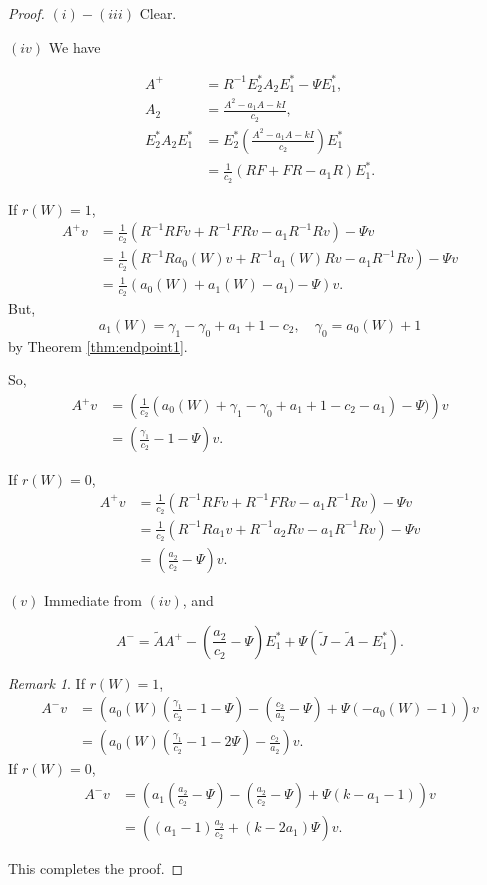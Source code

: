 \documentclass[
]{book}
\theoremstyle{definition}
\theoremstyle{definition}
\theoremstyle{definition}
\theoremstyle{definition}
\theoremstyle{remark}
\newtheorem*{remark}{Remark}
\begin{document}
\begin{proof}
\leavevmode

\((i)-(iii)\) Clear.

\((iv)\) We have

\begin{align}
A^+ & = R^{-1}E^*_2A_2E^*_1 - \Psi E^*_1,\\
A_2 & = \frac{A^2-a_1A - kI}{c_2},\\
E^*_2A_2E^*_1 & = E^*_2\left(\frac{A^2-a_1A - kI}{c_2}\right)E^*_1\\
& = \frac{1}{c_2}(RF + FR - a_1R)E^*_1.
\end{align}

If \(r(W) = 1\),
\begin{align}
A^+v & = \frac{1}{c_2}(R^{-1}RFv + R^{-1}FRv - a_1R^{-1}Rv) - \Psi v\\
& = \frac{1}{c_2}(R^{-1}Ra_0(W)v + R^{-1}a_1(W)Rv - a_1R^{-1}Rv) - \Psi v\\
& = \frac{1}{c_2}\left(a_0(W) + a_1(W) - a_1) - \Psi\right)v.
\end{align}
But,
\[a_1(W) = \gamma_1 - \gamma_0 + a_1 + 1 - c_2, \quad \gamma_0 = a_0(W) + 1\]
by Theorem \ref{thm:endpoint1}.

So,
\begin{align}
A^+v & = \left(\frac{1}{c_2}(a_0(W) + \gamma_1 - \gamma_0 + a_1 + 1 - c_2 - a_1) - \Psi)\right)v\\
& = \left(\frac{\gamma_1}{c_2}-1-\Psi\right)v.
\end{align}

If \(r(W) = 0\),
\begin{align}
A^+v & = \frac{1}{c_2}(R^{-1}RFv + R^{-1}FRv - a_1R^{-1}Rv) - \Psi v\\
& = \frac{1}{c_2}(R^{-1}Ra_1v + R^{-1}a_2Rv - a_1R^{-1}Rv) - \Psi v\\
& = \left(\frac{a_2}{c_2}-\Psi\right)v.
\end{align}

\((v)\) Immediate from \((iv)\), and

\[A^- = \tilde{A}A^+ - \left(\frac{a_2}{c_2} - \Psi\right)E^*_1 + \Psi(\tilde{J}-\tilde{A}-E^*_1).\]

\begin{remark}
If \(r(W) =1\),
\begin{align}
A^-v & = \left(a_0(W)\left(\frac{\gamma_1}{c_2}-1-\Psi\right) - \left(\frac{c_2}{a_2}-\Psi\right) + \Psi(-a_0(W)-1)\right) v\\
& = \left(a_0(W)\left(\frac{\gamma_1}{c_2}-1-2\Psi\right) - \frac{c_2}{a_2}\right)v.
\end{align}
If \(r(W) = 0\),
\begin{align}
A^-v & = \left(a_1\left(\frac{a_2}{c_2}-\Psi\right) - \left(\frac{a_2}{c_2}-\Psi\right) + \Psi(k-a_1-1)\right) v\\
& = \left((a_1-1)\frac{a_2}{c_2}+ (k-2a_1)\Psi\right)v.
\end{align}
\end{remark}

This completes the proof.

\end{proof}
\end{document}
